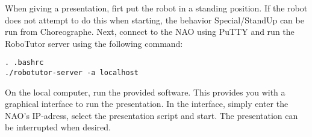 When giving a presentation, firt put the robot in a standing position. If the robot does not attempt to do this when starting, the behavior Special/StandUp can be run from Choreographe.
Next, connect to the NAO using PuTTY and run the RoboTutor server using the following command:

\begin{verbatim}
. .bashrc
./robotutor-server -a localhost
\end{verbatim}


On the local computer, run the provided software. This provides you with a graphical interface to run the presentation. In the interface, simply enter the NAO's IP-adress, select the presentation script and start. The presentation can be interrupted when desired.